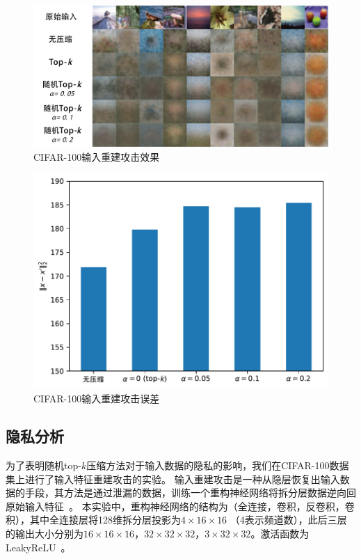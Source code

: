 \begin{figure}[htbp]
    \centering
    \includegraphics[width=\linewidth]{Z_Resources/随机topk_inversion-attack.pdf}
    \caption{CIFAR-100输入重建攻击效果}
    \label{fig:randomized_topk-inversion_attack}
\end{figure}

\begin{figure}[h!]
    \centering
    \includegraphics[width=0.58\linewidth]{Z_Resources/随机topk_attack-error.pdf}
    \caption{CIFAR-100输入重建攻击误差}
    \label{fig:randomized_topk-attack-error}
\end{figure}


\subsection{隐私分析}
为了表明随机top-$k$压缩方法对于输入数据的隐私的影响，我们在CIFAR-100数据集上进行了输入特征重建攻击的实验。
%
输入重建攻击是一种从隐层恢复出输入数据的手段，其方法是通过泄漏的数据，训练一个重构神经网络将拆分层数据逆向回原始输入特征~\cite{hezecheng_2019_model_inversion_attack,vepakomma2020nopeek}。
%
本实验中，重构神经网络的结构为（全连接，卷积，反卷积，卷积），其中全连接层将128维拆分层投影为$4 \times 16\times 16$ （4表示频道数），此后三层的输出大小分别为$16\times 16 \times  16$，$32\times 32 \times 32$，$3\times 32 \times 32$。激活函数为LeakyReLU~\cite{maas2013leaky_relu}。

